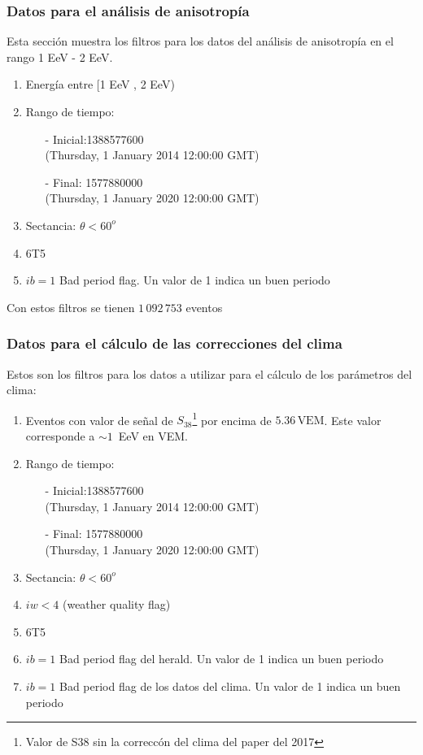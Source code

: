 \subsubsection{Datos para el análisis de anisotropía}
Esta sección muestra los filtros para los datos del análisis de anisotropía en el rango 1 EeV - 2 EeV.

\begin{enumerate}
	\item Energía entre  [1 EeV , 2 EeV)
	\item Rango de tiempo:
	\begin{itemize}
		\item[-] Inicial:1388577600 \\ (Thursday, 1 January 2014 12:00:00 GMT)
		\item[-] Final: 1577880000  \\ (Thursday, 1 January 2020 12:00:00 GMT)
	\end{itemize}
	\item Sectancia:  $\theta < 60^o$
	\item 6T5
	\item $ib=1$ Bad period flag. Un valor de 1 indica un buen periodo
\end{enumerate}

Con estos filtros se tienen $1\,092\,753$ eventos

\subsubsection{Datos para el cálculo de las correcciones del clima}

Estos son los filtros para los datos a utilizar para el cálculo de los parámetros del clima:

\begin{enumerate}
	\item Eventos con valor de señal de $S_{38}$\footnote{Valor de S38 sin la correccón del clima del paper del 2017} por encima de  $5.36\,\text{VEM}$. Este valor corresponde a $\sim 1\,$ EeV  en VEM.
	\item Rango de tiempo:
	\begin{itemize}
		\item[-] Inicial:1388577600 \\ (Thursday, 1 January 2014 12:00:00 GMT)
		\item[-] Final: 1577880000  \\ (Thursday, 1 January 2020 12:00:00 GMT)
	\end{itemize}
	\item Sectancia:  $\theta < 60^o$
	\item $iw<4$ (weather quality flag)
	\item 6T5
	\item $ib=1$ Bad period flag del herald.  Un valor de 1 indica un buen periodo
	\item $ib=1$ Bad period flag de los datos del clima. Un valor de 1 indica un buen periodo
\end{enumerate}


